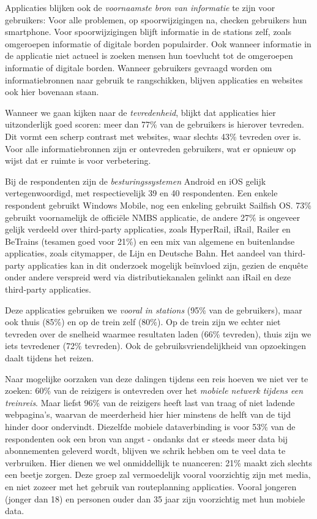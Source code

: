 Applicaties blijken ook de \emph{voornaamste bron van informatie} te zijn voor gebruikers: Voor alle problemen, op spoorwijzigingen na, checken gebruikers hun smartphone. Voor spoorwijzigingen blijft informatie in de stations zelf, zoals omgeroepen informatie of digitale borden populairder. Ook wanneer informatie in de applicatie niet actueel is zoeken mensen hun toevlucht tot de omgeroepen informatie of digitale borden. Wanneer gebruikers gevraagd worden om informatiebronnen naar gebruik te rangschikken, blijven applicaties en websites ook hier bovenaan staan.

Wanneer we gaan kijken naar de \emph{tevredenheid}, blijkt dat applicaties hier uitzonderlijk goed scoren: meer dan 77\% van de gebruikers is hierover tevreden. Dit vormt een scherp contrast met websites, waar slechts 43\% tevreden over is. Voor alle informatiebronnen zijn er ontevreden gebruikers, wat er opnieuw op wijst dat er ruimte is voor verbetering.

Bij de respondenten zijn de \emph{besturingssystemen} Android en iOS gelijk vertegenwoordigd, met respectievelijk 39 en 40 respondenten. Een enkele respondent gebruikt Windows Mobile, nog een enkeling gebruikt Sailfish OS. 73\% gebruikt voornamelijk de officiële NMBS applicatie, de andere 27\% is ongeveer gelijk verdeeld over third-party applicaties, zoals HyperRail, iRail, Railer en BeTrains (tesamen goed voor 21\%) en een mix van algemene en buitenlandse applicaties, zoals citymapper, de Lijn en Deutsche Bahn. Het aandeel van third-party applicaties kan in dit onderzoek mogelijk beïnvloed zijn, gezien de enquête onder andere verspreid werd via distributiekanalen gelinkt aan iRail en deze third-party applicaties.

Deze applicaties gebruiken we \emph{vooral in stations} (95\% van de gebruikers), maar ook thuis (85\%) en op de trein zelf (80\%). Op de trein zijn we echter niet tevreden over de snelheid waarmee resultaten laden (66\% tevreden), thuis zijn we iets tevredener (72\% tevreden). Ook de gebruiksvriendelijkheid van opzoekingen daalt tijdens het reizen. 

Naar mogelijke oorzaken van deze dalingen tijdens een reis hoeven we niet ver te zoeken: 60\% van de reizigers is ontevreden over het \emph{mobiele netwerk tijdens een treinreis}. Maar liefst 96\% van de reizigers heeft last van traag of niet ladende webpagina's, waarvan de meerderheid hier hier minstens de helft van de tijd hinder door ondervindt. Diezelfde mobiele dataverbinding is voor 53\% van de respondenten ook een bron van angst - ondanks dat er steeds meer data bij abonnementen geleverd wordt, blijven we schrik hebben om te veel data te verbruiken. Hier dienen we wel onmiddellijk te nuanceren: 21\% maakt zich slechts een beetje zorgen. Deze groep zal vermoedelijk vooral voorzichtig zijn met media, en niet zozeer met het gebruik van routeplanning applicaties. Vooral jongeren (jonger dan 18) en personen ouder dan 35 jaar zijn voorzichtig met hun mobiele data.

